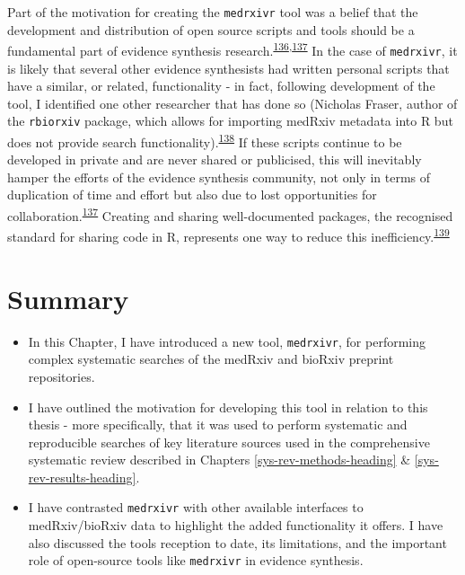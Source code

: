 \documentclass[a4paper, twoside]{templates/ociamthesis}
\begin{document}
Part of the motivation for creating the \texttt{medrxivr} tool was a belief that the development and distribution of open source scripts and tools should be a fundamental part of evidence synthesis research.\textsuperscript{\protect\hyperlink{ref-goldacre2019}{136},\protect\hyperlink{ref-mckiernan2016}{137}} In the case of \texttt{medrxivr}, it is likely that several other evidence synthesists had written personal scripts that have a similar, or related, functionality - in fact, following development of the tool, I identified one other researcher that has done so (Nicholas Fraser, author of the \texttt{rbiorxiv} package, which allows for importing medRxiv metadata into R but does not provide search functionality).\textsuperscript{\protect\hyperlink{ref-fraser2020rbiorixv}{138}} If these scripts continue to be developed in private and are never shared or publicised, this will inevitably hamper the efforts of the evidence synthesis community, not only in terms of duplication of time and effort but also due to lost opportunities for collaboration.\textsuperscript{\protect\hyperlink{ref-mckiernan2016}{137}} Creating and sharing well-documented packages, the recognised standard for sharing code in R, represents one way to reduce this inefficiency.\textsuperscript{\protect\hyperlink{ref-vuorre2020}{139}}

\hypertarget{summary-1}{%
\section{Summary}\label{summary-1}}

\begin{itemize}
\item
  In this Chapter, I have introduced a new tool, \texttt{medrxivr}, for performing complex systematic searches of the medRxiv and bioRxiv preprint repositories.
\item
  I have outlined the motivation for developing this tool in relation to this thesis - more specifically, that it was used to perform systematic and reproducible searches of key literature sources used in the comprehensive systematic review described in Chapters \ref{sys-rev-methods-heading} \& \ref{sys-rev-results-heading}.
\item
  I have contrasted \texttt{medrxivr} with other available interfaces to medRxiv/bioRxiv data to highlight the added functionality it offers. I have also discussed the tools reception to date, its limitations, and the important role of open-source tools like \texttt{medrxivr} in evidence synthesis.
\end{itemize}
\end{document}
